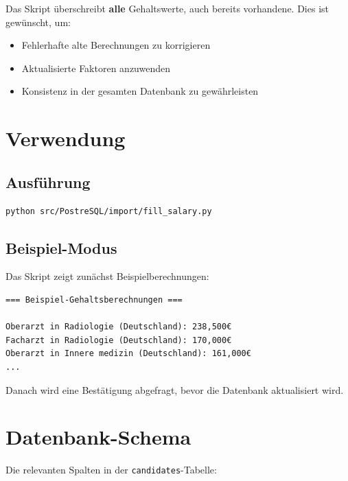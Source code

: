 \documentclass[12pt,a4paper]{article}
\begin{document}
Das Skript überschreibt \textbf{alle} Gehaltswerte, auch bereits vorhandene. Dies ist gewünscht, um:
\begin{itemize}
    \item Fehlerhafte alte Berechnungen zu korrigieren
    \item Aktualisierte Faktoren anzuwenden
    \item Konsistenz in der gesamten Datenbank zu gewährleisten
\end{itemize}

\section{Verwendung}

\subsection{Ausführung}

\begin{verbatim}
python src/PostreSQL/import/fill_salary.py
\end{verbatim}

\subsection{Beispiel-Modus}

Das Skript zeigt zunächst Beispielberechnungen:
\begin{verbatim}
=== Beispiel-Gehaltsberechnungen ===

Oberarzt in Radiologie (Deutschland): 238,500€
Facharzt in Radiologie (Deutschland): 170,000€
Oberarzt in Innere medizin (Deutschland): 161,000€
...
\end{verbatim}

Danach wird eine Bestätigung abgefragt, bevor die Datenbank aktualisiert wird.

\section{Datenbank-Schema}

Die relevanten Spalten in der \texttt{candidates}-Tabelle:
\end{document}
